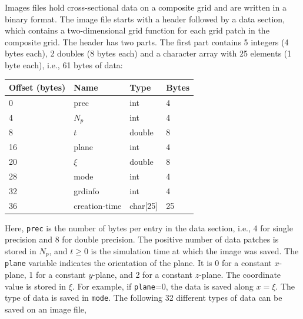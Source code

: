 \documentclass[11pt]{report}
\begin{document}
Images files hold cross-sectional data on a composite grid and are written in a binary format. The
image file starts with a header followed by a data section, which contains a two-dimensional grid
function for each grid patch in the composite grid. The header has two parts. The first part
contains 5 integers (4 bytes each), 2 doubles (8 bytes each) and a character array with 25 elements
(1 byte each), i.e., 61 bytes of data:
\begin{center}
\begin{tabular}{llll}\hline
Offset (bytes) & Name & Type & Bytes \\ \hline
0 & prec   & int & 4 \\ \hline
4 & $N_p$  & int & 4 \\ \hline
8 & $t$    & double & 8 \\ \hline
16 & plane & int & 4 \\ \hline
20 & $\xi$ & double & 8 \\ \hline
28 & mode  & int & 4 \\ \hline
32 & grdinfo & int & 4 \\ \hline
36 & creation-time & char[25] & 25 \\ \hline
\end{tabular}
\end{center}
Here, {\tt prec} is the number of bytes per entry in the data section, i.e., 4 for single precision
and 8 for double precision. The positive number of data patches is stored in $N_p$, and $t\geq 0$ is the
simulation time at which the image was saved. The {\tt plane} variable indicates the orientation of
the plane. It is 0 for a constant $x$-plane, 1 for a constant $y$-plane, and 2 for a constant
$z$-plane. The coordinate value is stored in $\xi$. For example, if {\tt plane}=0, the data is saved
along $x=\xi$. The type of data is saved in {\tt mode}. The following 32 different types of data can
be saved on an image file,
\end{document}
